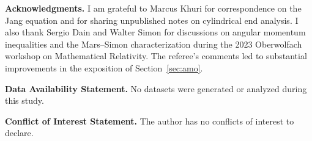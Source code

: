\documentclass[12pt]{article}
\theoremstyle{plain}
\theoremstyle{definition}
\theoremstyle{remark}
\begin{document}

\vspace{1cm}
\noindent
\textbf{Acknowledgments.} I am grateful to Marcus Khuri for correspondence on the Jang equation and for sharing unpublished notes on cylindrical end analysis. I also thank Sergio Dain and Walter Simon for discussions on angular momentum inequalities and the Mars--Simon characterization during the 2023 Oberwolfach workshop on Mathematical Relativity. The referee's comments led to substantial improvements in the exposition of Section~\ref{sec:amo}.


\vspace{0.5cm}
\noindent
\textbf{Data Availability Statement.} No datasets were generated or analyzed during this study.


\vspace{0.5cm}
\noindent
\textbf{Conflict of Interest Statement.} The author has no conflicts of interest to declare.


\newpage
\end{document}
